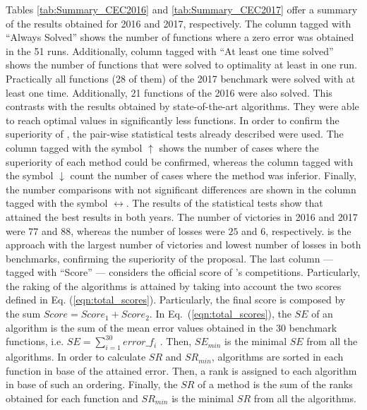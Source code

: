 Tables \ref{tab:Summary_CEC2016} and \ref{tab:Summary_CEC2017} offer a summary of the results obtained for \CEC{} 2016 and \CEC{} 2017, respectively.
%
The column tagged with ``Always Solved'' shows the number of functions where a zero error was obtained in the 51 runs.
%
Additionally, column tagged with ``At least one time solved'' shows the number of functions that were solved to optimality at least in one run.
%
Practically all functions (28 of them) of the \CEC{} 2017 benchmark were solved with \DEEDM{} at least one time.
%
Additionally, 21 functions of the \CEC{} 2016 were also solved.
%
This contrasts with the results obtained by state-of-the-art algorithms.
%
They were able to reach optimal values in significantly less functions.
%
In order to confirm the superiority of \DEEDM{}, the pair-wise statistical tests already described were used.
%
The column tagged with the symbol $\uparrow$ shows the number of cases where the superiority of each method could be confirmed, whereas
the column tagged with the symbol $\downarrow$ count the number of cases where the method was inferior.
%
Finally, the number comparisons with not significant differences are shown in the column tagged with the symbol $\longleftrightarrow$.
%
The results of the statistical tests show that \DEEDM{} attained the best results in both years.
%
The number of victories in \CEC{} 2016 and \CEC{} 2017 were $77$ and $88$, whereas 
the number of losses were $25$ and $6$, respectively.
%
\DEEDM{} is the approach with the largest number of victories and lowest number of losses in both benchmarks, confirming the superiority
of the proposal.
%
%
The last column --- tagged with ``Score'' --- considers the official score of \CEC{}'s competitions.
%
Particularly, the raking of the algorithms is attained by taking into account the two scores defined in Eq. (\ref{eqn:total_scores}).
%
Particularly, the final score is composed by the sum $Score = Score_1 + Score_2$.
%
In Eq.~(\ref{eqn:total_scores}), the $SE$ of an algorithm is the sum of the mean error values obtained in the $30$ benchmark functions, i.e. 
$SE = \sum_{i=1}^{30} error\_f_i$ .
%
Then, $SE_{min}$ is the minimal $SE$ from all the algorithms. 
%
In order to calculate $SR$ and $SR_{min}$, algorithms are sorted in each function in base of the attained error.
%
Then, a rank is assigned to each algorithm in base of such an ordering.
%
Finally, the $SR$ of a method is the sum of the ranks obtained for each function and $SR_{min}$ is the minimal $SR$ from all the algorithms.

